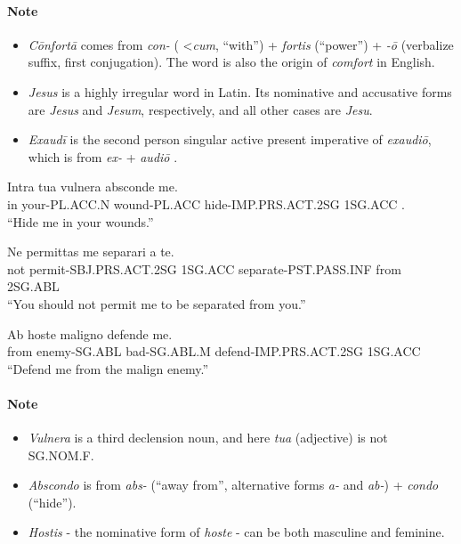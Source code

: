 \documentclass[a4paper]{article}
\begin{document}
\paragraph{Note} \begin{itemize}
    \item \emph{Cōnfortā} comes from \emph{con-} ( \textless \emph{cum}, ``with'') + \emph{fortis} (``power'') + \emph{-ō} (verbalize suffix, first conjugation). The word is also the origin of \emph{comfort} in English.
    \item \emph{Jesus} is a highly irregular word in Latin. Its nominative and accusative forms are \emph{Jesus} and \emph{Jesum}, respectively, and all other cases are \emph{Jesu}.
    \item \emph{Exaudī} is the second person singular active present imperative of \emph{exaudiō}, which is from \emph{ex-} + \emph{audiō }.
\end{itemize}

\begin{exe}
    
\sn
\gll Intra tua            vulnera        absconde             me. \\
     in    your-PL.ACC.N  wound-PL.ACC   hide-IMP.PRS.ACT.2SG 1SG.ACC  . \\
\glt ``Hide me in your wounds.''

\sn
\gll Ne   permittas               me       separari                a     te. \\
     not  permit-SBJ.PRS.ACT.2SG  1SG.ACC  separate-PST.PASS.INF   from  2SG.ABL \\
\glt ``You should not permit me to be separated from you.''

\sn
\gll Ab    hoste          maligno        defende                 me. \\
     from  enemy-SG.ABL   bad-SG.ABL.M   defend-IMP.PRS.ACT.2SG  1SG.ACC \\
\glt ``Defend me from the malign enemy.''

\end{exe}

\paragraph{Note} \begin{itemize}
    \item \emph{Vulnera} is a third declension noun, and here \emph{tua} (adjective) is not SG.NOM.F. 
    \item \emph{Abscondo} is from \emph{abs-} (``away from'', alternative forms \emph{a-} and \emph{ab-}) + \emph{condo} (``hide'').
    \item \emph{Hostis} - the nominative form of \emph{hoste} - can be both masculine and feminine.
\end{itemize}
\end{document}
